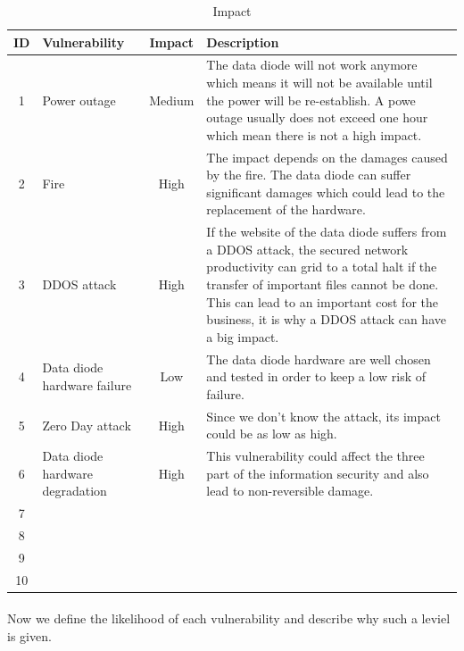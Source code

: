 \documentclass[a4paper,10pt]{article}
\begin{document}
\begin{table}[!h]
	\centering
	\begin{tabular}{|c|p{2.5cm}|c|p{10cm}|}
		\hline
		\textbf{ID}& \textbf{Vulnerability} &\textbf{Impact} & \textbf{Description}                 \\
		\hline
		1 & Power outage & Medium  &  The data diode will not work anymore which means it will not be available until the power will be re-establish. A powe outage usually does not exceed one hour which mean there is not a high impact. \\
		\hline
		2 & Fire & High  &  The impact depends on the damages caused by the fire. The data diode can suffer significant damages which could lead to the replacement of the hardware.\\
		\hline
		3 & DDOS attack & High & If the website of the data diode suffers from a DDOS attack, the secured network productivity can grid to a total halt if the transfer of important files cannot be done. This can lead to an important cost for the business, it is why a DDOS attack can have a big impact.\\
		\hline
		4 & Data diode hardware failure  & Low & The data diode hardware are well chosen and tested in order to keep a low risk of failure.\\ 
		\hline
		5 & Zero Day attack & High & Since we don't know the attack, its impact could be as low as high.\\
		\hline
		6 & Data diode hardware degradation & High & This vulnerability could affect the three part of the information security and also lead to non-reversible damage. \\
		\hline
		7 & & & \\
		\hline
		8 & & & \\
		\hline
		9 & & & \\
		\hline
		10 & & & \\
		\hline
	\end{tabular}
	\caption{Impact}
\end{table}

\paragraph{} Now we define the likelihood of each vulnerability and describe why such a leviel is given.
\end{document}
